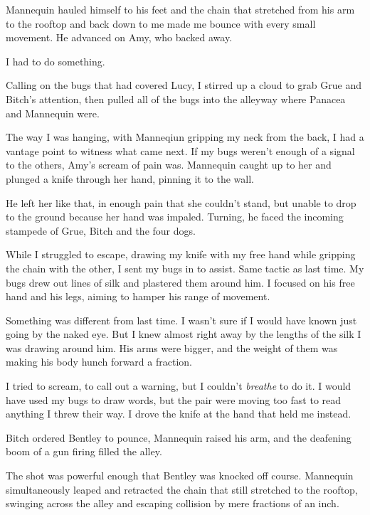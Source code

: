 Mannequin hauled himself to his feet and the chain that stretched from his arm to the rooftop and back down to me made me bounce with every small movement.  He advanced on Amy, who backed away.



I had to do something.



Calling on the bugs that had covered Lucy, I stirred up a cloud to grab Grue and Bitch's attention, then pulled all of the bugs into the alleyway where Panacea and Mannequin were.



The way I was hanging, with Manneqiun gripping my neck from the back, I had a vantage point to witness what came next.  If my bugs weren't enough of a signal to the others, Amy's scream of pain was.  Mannequin caught up to her and plunged a knife through her hand, pinning it to the wall.



He left her like that, in enough pain that she couldn't stand, but unable to drop to the ground because her hand was impaled.  Turning, he faced the incoming stampede of Grue, Bitch and the four dogs.



While I struggled to escape, drawing my knife with my free hand while gripping the chain with the other, I sent my bugs in to assist.  Same tactic as last time.  My bugs drew out lines of silk and plastered them around him.  I focused on his free hand and his legs, aiming to hamper his range of movement.



Something was different from last time.  I wasn't sure if I would have known just going by the naked eye.  But I knew almost right away by the lengths of the silk I was drawing around him.  His arms were bigger, and the weight of them was making his body hunch forward a fraction.



I tried to scream, to call out a warning, but I couldn't \emph{breathe} to do it.  I would have used my bugs to draw words, but the pair were moving too fast to read anything I threw their way.  I drove the knife at the hand that held me instead.



Bitch ordered Bentley to pounce, Mannequin raised his arm, and the deafening boom of a gun firing filled the alley.



The shot was powerful enough that Bentley was knocked off course.  Mannequin simultaneously leaped and retracted the chain that still stretched to the rooftop, swinging across the alley and escaping collision by mere fractions of an inch.



